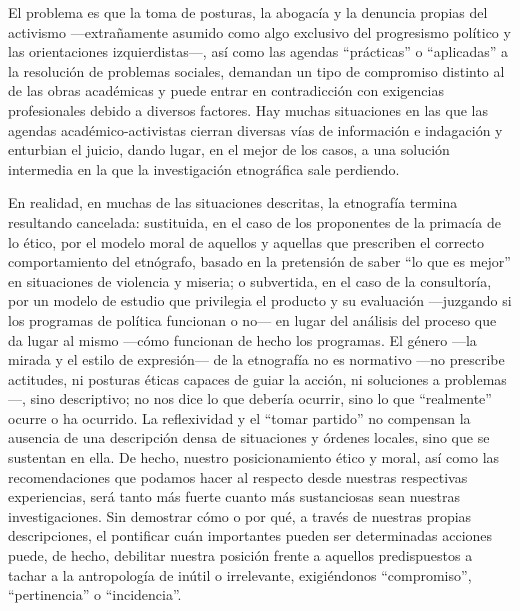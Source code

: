 \documentclass[
  spanish,
  11pt,
  a4paper,
]{scrbook}
\begin{document}
El problema es que la toma de posturas, la abogacía y la denuncia
propias del activismo ---extrañamente asumido como algo exclusivo del
progresismo político y las orientaciones izquierdistas---, así como las
agendas ``prácticas'' o ``aplicadas'' a la resolución de problemas
sociales, demandan un tipo de compromiso distinto al de las obras
académicas y puede entrar en contradicción con exigencias profesionales
debido a diversos factores. Hay muchas situaciones en las que las
agendas académico-activistas cierran diversas vías de información e
indagación y enturbian el juicio, dando lugar, en el mejor de los casos,
a una solución intermedia en la que la investigación etnográfica sale
perdiendo.

En realidad, en muchas de las situaciones descritas, la etnografía
termina resultando cancelada: sustituida, en el caso de los proponentes
de la primacía de lo ético, por el modelo moral de aquellos y aquellas
que prescriben el correcto comportamiento del etnógrafo, basado en la
pretensión de saber ``lo que es mejor'' en situaciones de violencia y
miseria; o subvertida, en el caso de la consultoría, por un modelo de
estudio que privilegia el producto y su evaluación ---juzgando si los
programas de política funcionan o no--- en lugar del análisis del
proceso que da lugar al mismo ---cómo funcionan de hecho los programas.
El género ---la mirada y el estilo de expresión--- de la etnografía no
es normativo ---no prescribe actitudes, ni posturas éticas capaces de
guiar la acción, ni soluciones a problemas---, sino descriptivo; no nos
dice lo que debería ocurrir, sino lo que ``realmente'' ocurre o ha
ocurrido. La reflexividad y el ``tomar partido'' no compensan la
ausencia de una descripción densa de situaciones y órdenes locales, sino
que se sustentan en ella. De hecho, nuestro posicionamiento ético y
moral, así como las recomendaciones que podamos hacer al respecto desde
nuestras respectivas experiencias, será tanto más fuerte cuanto más
sustanciosas sean nuestras investigaciones. Sin demostrar cómo o por
qué, a través de nuestras propias descripciones, el pontificar cuán
importantes pueden ser determinadas acciones puede, de hecho, debilitar
nuestra posición frente a aquellos predispuestos a tachar a la
antropología de inútil o irrelevante, exigiéndonos ``compromiso'',
``pertinencia'' o ``incidencia''.
\end{document}
